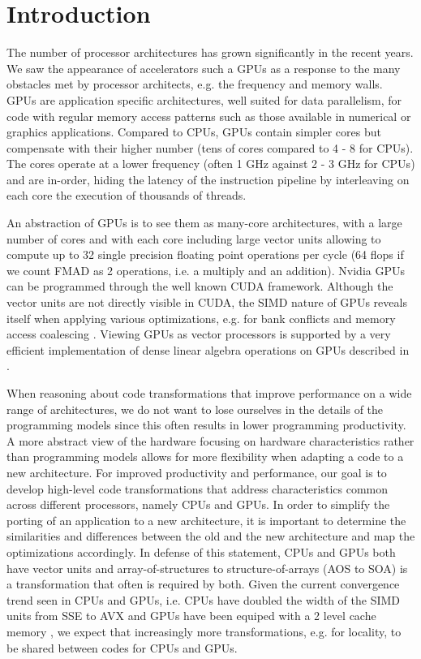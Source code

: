 \section{Introduction}
The number of processor architectures has grown significantly in the recent
years. We saw the appearance of accelerators such a GPUs as a response to the
many obstacles met by processor architects, e.g. the frequency and memory walls.
GPUs are application specific architectures, well suited for data parallelism,
for code with regular memory access patterns such as those available in
numerical or graphics applications. Compared to CPUs, GPUs contain simpler cores
but compensate with their higher number (tens of cores compared to 4 - 8 for
CPUs). The cores operate at a lower frequency (often 1 GHz against 2 - 3 GHz for
CPUs) and are in-order, hiding the latency of the instruction pipeline by
interleaving on each core the execution of thousands of threads.

An abstraction of GPUs is to see them as many-core architectures, with
a large number of cores and with each core including large vector units
allowing to compute up to 32 single precision floating point operations per cycle 
(64 flops if we count FMAD as 2 operations, i.e. a multiply and an addition). 
Nvidia GPUs can be programmed through the well known CUDA framework. Although the vector units are not directly 
visible in CUDA, the SIMD nature of GPUs reveals itself when applying various optimizations, 
e.g. for bank conflicts and memory access coalescing \cite{cuda}. Viewing GPUs as vector processors
is supported by a very efficient implementation of dense linear algebra operations on GPUs described in 
\cite{Volkov:2008:BGT:1413370.1413402}.

When reasoning about code transformations that improve performance on a wide
range of architectures, we do not want to lose ourselves in the details of the
programming models since this often results in lower programming productivity. 
A more abstract view of the hardware focusing on hardware characteristics 
rather than programming models allows for more flexibility when adapting a
code to a new architecture. For improved productivity and performance, our goal 
is to develop high-level code transformations that address characteristics common 
across different processors, namely CPUs and GPUs.
In order to simplify the porting of an application to a new architecture, 
it is important to determine the similarities and differences between the old and the new architecture and 
map the optimizations accordingly. In defense of this statement, CPUs and GPUs both have vector units and
array-of-structures to structure-of-arrays (AOS to SOA) is a transformation that often is
required by both. Given the current convergence trend seen in CPUs and GPUs, i.e. CPUs have
doubled the width of the SIMD units from SSE to AVX and GPUs have been equiped with a 2 level cache memory \cite{fermi}, 
we expect that increasingly more transformations, e.g. for locality, to be shared between codes for CPUs and GPUs.

